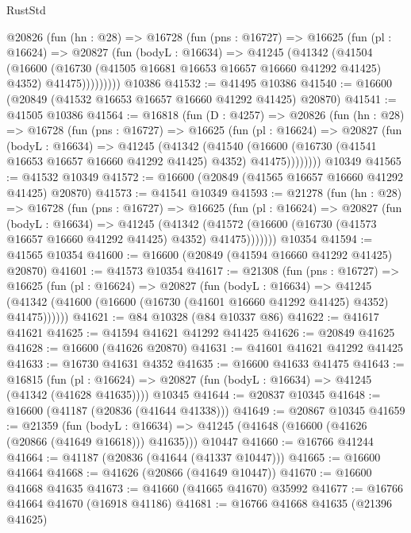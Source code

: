 \begin{lexlean}{RustStd}
\begin{coremodule}
{\begin{coremodule}
{{{{{{{{{{{{{{{{{{{{{{{{{{{{{{{{{{{{{{{{{{{{{{{{{{{{{{{      @20826
        (fun (hn : @28) =>
        @16728
          (fun (pns : @16727) =>
          @16625
            (fun (pl : @16624) =>
            @20827
              (fun (bodyL : @16634) =>
              @41245
                (@41342
                  (@41504
                    (@16600
                      (@16730 (@41505 @16681 @16653 @16657 @16660 @41292 @41425) @4352)
                      @41475)))))))))
    @10386
@41532 := @41495 @10386
@41540 := @16600 (@20849 (@41532 @16653 @16657 @16660 @41292 @41425) @20870)
@41541 := @41505 @10386
@41564 := @16818
    (fun (D : @4257) =>
    @20826
      (fun (hn : @28) =>
      @16728
        (fun (pns : @16727) =>
        @16625
          (fun (pl : @16624) =>
          @20827
            (fun (bodyL : @16634) =>
            @41245
              (@41342
                (@41540
                  (@16600 (@16730 (@41541 @16653 @16657 @16660 @41292 @41425) @4352) @41475))))))))
    @10349
@41565 := @41532 @10349
@41572 := @16600 (@20849 (@41565 @16657 @16660 @41292 @41425) @20870)
@41573 := @41541 @10349
@41593 := @21278
    (fun (hn : @28) =>
    @16728
      (fun (pns : @16727) =>
      @16625
        (fun (pl : @16624) =>
        @20827
          (fun (bodyL : @16634) =>
          @41245
            (@41342
              (@41572 (@16600 (@16730 (@41573 @16657 @16660 @41292 @41425) @4352) @41475)))))))
    @10354
@41594 := @41565 @10354
@41600 := @16600 (@20849 (@41594 @16660 @41292 @41425) @20870)
@41601 := @41573 @10354
@41617 := @21308
    (fun (pns : @16727) =>
    @16625
      (fun (pl : @16624) =>
      @20827
        (fun (bodyL : @16634) =>
        @41245 (@41342 (@41600 (@16600 (@16730 (@41601 @16660 @41292 @41425) @4352) @41475))))))
@41621 := @84 @10328 (@84 @10337 @86)
@41622 := @41617 @41621
@41625 := @41594 @41621 @41292 @41425
@41626 := @20849 @41625
@41628 := @16600 (@41626 @20870)
@41631 := @41601 @41621 @41292 @41425
@41633 := @16730 @41631 @4352
@41635 := @16600 @41633 @41475
@41643 := @16815
    (fun (pl : @16624) => @20827 (fun (bodyL : @16634) => @41245 (@41342 (@41628 @41635))))
    @10345
@41644 := @20837 @10345
@41648 := @16600 (@41187 (@20836 (@41644 @41338)))
@41649 := @20867 @10345
@41659 := @21359
    (fun (bodyL : @16634) => @41245 (@41648 (@16600 (@41626 (@20866 (@41649 @16618))) @41635)))
    @10447
@41660 := @16766 @41244
@41664 := @41187 (@20836 (@41644 (@41337 @10447)))
@41665 := @16600 @41664
@41668 := @41626 (@20866 (@41649 @10447))
@41670 := @16600 @41668 @41635
@41673 := @41660 (@41665 @41670) @35992
@41677 := @16766 @41664 @41670 (@16918 @41186)
@41681 := @16766 @41668 @41635 (@21396 @41625)
}}}}}}}}}}}}}}}}}}}}}}}}}}}}}}}}}}}}}}}}}}}}}}}}}}}}}}}
\end{coremodule}}
\end{coremodule}
\end{lexlean}

